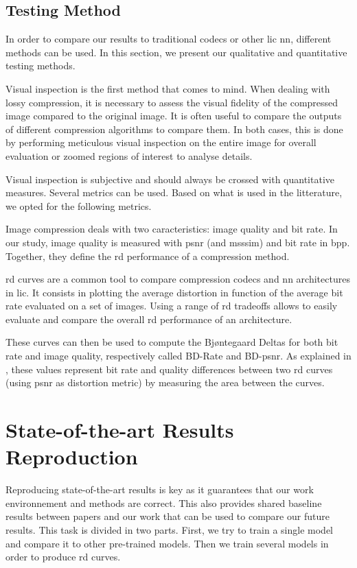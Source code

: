 \subsection{Testing Method}
In order to compare our results to traditional codecs or other \acrshort{lic} \acrshort{nn}, different methods can be used. In this section, we present our qualitative and quantitative testing methods.

Visual inspection is the first method that comes to mind. When dealing with lossy compression, it is necessary to assess the visual fidelity of the compressed image compared to the original image. It is often useful to compare the outputs of different compression algorithms to compare them. In both cases, this is done by performing meticulous visual inspection on the entire image for overall evaluation or zoomed regions of interest to analyse details.

Visual inspection is subjective and should always be crossed with quantitative measures. Several metrics can be used. Based on what is used in the litterature, we opted for the following metrics.

Image compression deals with two caracteristics: image quality and bit rate. In our study, image quality is measured with \acrfull{psnr} (and \acrfull{msssim}) and bit rate in \acrfull{bpp}. Together, they define the \acrshort{rd} performance of a compression method.

\acrshort{rd} curves are a common tool to compare compression codecs and \acrshort{nn} architectures in \acrshort{lic}. It consists in plotting the average distortion in function of the average bit rate evaluated on a set of images. Using a range of \acrshort{rd} tradeoffs allows to easily evaluate and compare the overall \acrshort{rd} performance of an architecture.

These curves can then be used to compute the Bjøntegaard Deltas for both bit rate and image quality, respectively called BD-Rate and BD-\acrshort{psnr}. As explained in \cite{barman2024bjontegaarddeltabdtutorial}, these values represent bit rate and quality differences between two \acrshort{rd} curves (using \acrshort{psnr} as distortion metric) by measuring the area between the curves. %

\section{State-of-the-art Results Reproduction}
Reproducing state-of-the-art results is key as it guarantees that our work environnement and methods are correct. This also provides shared baseline results between papers and our work that can be used to compare our future results. This task is divided in two parts. First, we try to train a single model and compare it to other pre-trained models. Then we train several models in order to produce \acrshort{rd} curves.

